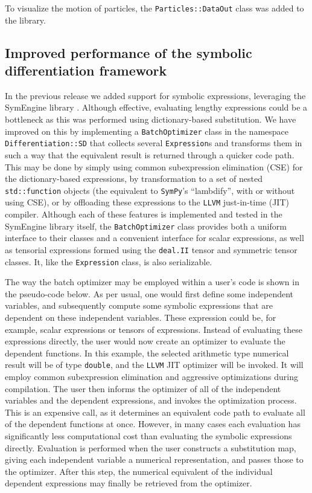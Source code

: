 \documentclass{ansarticle-preprint}
\begin{document}
To visualize the motion of particles, the \texttt{Particles::DataOut} class was added to the library.




\subsection{Improved performance of the symbolic differentiation framework}
\label{subsec:symbdiff}

In the previous release we added support for symbolic expressions, leveraging the
SymEngine library \cite{symengine-web-page}.
Although effective, evaluating lengthy expressions could be a bottleneck as this
was performed using dictionary-based substitution.
We have improved on this by implementing a \texttt{BatchOptimizer} class in the
namespace \texttt{Differentiation::SD} that collects several \texttt{Expression}s
and transforms them in such a way that the equivalent result is returned through
a quicker code path.
This may be done by simply using common subexpression elimination (CSE) for the
dictionary-based expressions, by transformation to a set of nested
\texttt{std::function} objects (the equivalent to \texttt{SymPy}'s ``lambdify'', with or
without using CSE), or by offloading these expressions to the \texttt{LLVM}
just-in-time (JIT) compiler.
Although each of these features is implemented and tested in the SymEngine
library itself, the \texttt{BatchOptimizer} class provides both a uniform
interface to their classes and a convenient interface for scalar expressions,
as well as tensorial expressions formed using the \texttt{deal.II} tensor and
symmetric tensor classes.
It, like the \texttt{Expression} class, is also serializable.

The way the batch optimizer may be employed within a user's code is shown
in the pseudo-code below.
As per usual, one would first define some independent variables, and
subsequently compute some symbolic expressions that are dependent on these
independent variables.
These expression could be, for example, scalar  expressions or tensors of
expressions.
Instead of evaluating these expressions directly, the user would now create an
optimizer to evaluate the dependent functions.
In this example, the selected arithmetic type numerical result will be of type
\texttt{double}, and the \texttt{LLVM} JIT optimizer will be invoked.
It will employ common subexpression elimination and aggressive optimizations
during compilation.
The user then informs the optimizer of all of the independent variables and the
dependent expressions, and invokes the optimization process.
This is an expensive call, as it determines an equivalent code path to evaluate
all of the dependent functions at once.
However, in many cases each evaluation has significantly less computational cost
than evaluating the symbolic expressions directly.
Evaluation is performed when the user constructs a substitution map, giving each
independent variable a numerical representation, and passes those to the
optimizer.
After this step, the numerical equivalent of the individual dependent expressions
may finally be retrieved from the optimizer.
\end{document}
